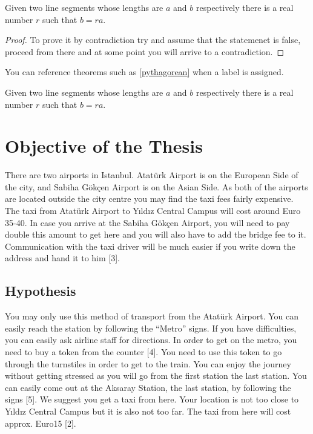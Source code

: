 \begin{lemma}
Given two line segments whose lengths are $a$ and $b$ respectively there 
is a real number $r$ such that $b=ra$.
\end{lemma}
 
\begin{proof}
To prove it by contradiction try and assume that the statemenet is false,
proceed from there and at some point you will arrive to a contradiction.
\end{proof}

 
You can reference theorems such as \ref{pythagorean} when a label is assigned.
 
\begin{lemma}
Given two line segments whose lengths are $a$ and $b$ respectively there is a 
real number $r$ such that $b=ra$.
\end{lemma}

\section{Objective of the Thesis}
There are two airports in Istanbul. Atatürk Airport is on the European Side of the city, and Sabiha Gökçen Airport is on the Asian Side. As both of the airports are located outside the city centre you may find the taxi\cite{rao2012novel} fees fairly expensive. The taxi from Atatürk Airport to Yıldız Central Campus will cost around Euro 35-40. In case you arrive at the Sabiha Gökçen Airport, you will need to pay double this amount to get here and you will also have to add the bridge fee to it. Communication with the taxi driver will be much easier if you write down the address and hand it to him [3].

\begin{landscape}
\section{Hypothesis}
You may only use this method of transport from the Atatürk Airport. You can easily reach the station by following the “Metro” signs. If you have difficulties, you can easily ask airline staff for directions. In order to get on the metro, you need to buy a token from the counter [4]. You need to use this token to go through the turnstiles in order to get to the train. You can enjoy the journey without getting stressed as you will go from the first station the last station. You can easily come out at the Aksaray Station, the last station, by following the signs [5]. We suggest you get a taxi from here. Your location is not too close to Yıldız Central Campus but it is also not too far. The taxi from here will cost approx. Euro15 [2].
\end{landscape}